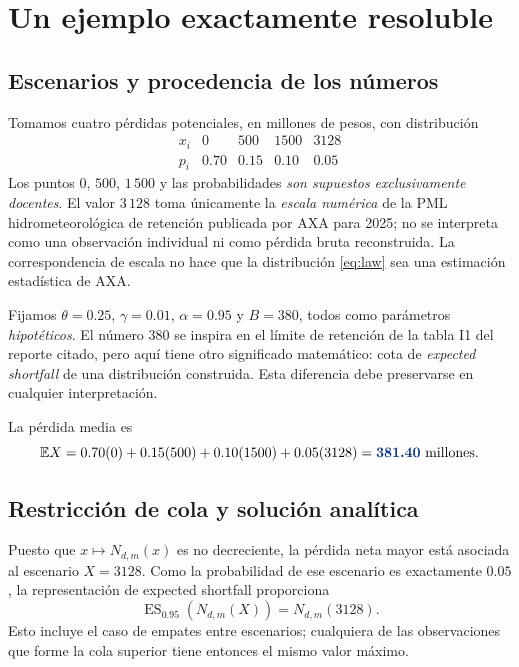 \documentclass[11pt,reqno]{amsart}
\theoremstyle{definition}\newtheorem{definition}[theorem]{Definición}
\theoremstyle{remark}\newtheorem{remark}[theorem]{Observación}
\DeclareMathOperator{\ES}{ES}
\newcommand{\E}{\mathbb E}
\newcommand{\resultado}[1]{{\color{resultblue}\boldsymbol{#1}}}
\begin{document}
\section{Un ejemplo exactamente resoluble}
\subsection{Escenarios y procedencia de los números}
Tomamos cuatro pérdidas potenciales, en millones de pesos, con distribución
\begin{equation}\label{eq:law}
\begin{array}{c|rrrr}
x_i&0&500&1500&3128\\\hline
p_i&0.70&0.15&0.10&0.05
\end{array}
\end{equation}
Los puntos $0$, $500$, $1\,500$ y las probabilidades \emph{son supuestos exclusivamente docentes}. El valor $3\,128$ toma únicamente la \emph{escala numérica} de la PML hidrometeorológica de retención publicada por AXA para 2025; no se interpreta como una observación individual ni como pérdida bruta reconstruida. La correspondencia de escala no hace que la distribución \eqref{eq:law} sea una estimación estadística de AXA.

Fijamos $\theta=0.25$, $\gamma=0.01$, $\alpha=0.95$ y $B=380$, todos como parámetros \emph{hipotéticos}. El número $380$ se inspira en el límite de retención de la tabla I1 del reporte citado, pero aquí tiene otro significado matemático: cota de \emph{expected shortfall} de una distribución construida. Esta diferencia debe preservarse en cualquier interpretación.

La pérdida media es
\[
\E X=0.70(0)+0.15(500)+0.10(1500)+0.05(3128)
=\resultado{381.40}\ \text{millones}.
\]

\subsection{Restricción de cola y solución analítica}
Puesto que $x\mapsto N_{d,m}(x)$ es no decreciente, la pérdida neta mayor está asociada al escenario $X=3128$. Como la probabilidad de ese escenario es exactamente $0.05$, la representación de expected shortfall proporciona
\begin{equation}\label{eq:cvarmax}
\ES_{0.95}(N_{d,m}(X))=N_{d,m}(3128).
\end{equation}
Esto incluye el caso de empates entre escenarios; cualquiera de las observaciones que forme la cola superior tiene entonces el mismo valor máximo.
\end{document}
